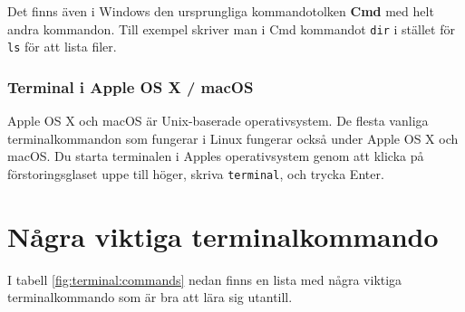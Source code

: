 Det finns även i Windows den ursprungliga kommandotolken \textbf{Cmd} med helt andra kommandon. Till exempel skriver man i Cmd kommandot \texttt{dir} i stället för \texttt{ls} för att lista filer. 



\subsubsection{Terminal i Apple OS X / macOS}


Apple OS X och macOS är Unix-baserade operativsystem. De flesta vanliga terminalkommandon som fungerar i Linux fungerar också under Apple OS X och macOS. Du starta terminalen i Apples operativsystem genom att klicka på förstoringsglaset uppe till höger, skriva \texttt{terminal}, och trycka Enter.



\section{Några viktiga terminalkommando}

I tabell \ref{fig:terminal:commands} nedan finns en lista med några viktiga terminalkommando som är bra att lära sig utantill.

